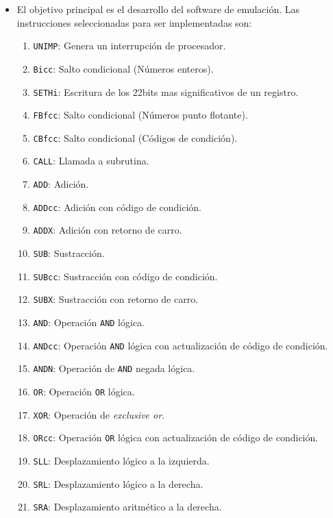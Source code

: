 \begin{itemize}
\item El objetivo principal es el desarrollo del software de emulación. Las instrucciones seleccionadas para ser implementadas son:
  \begin{enumerate}

    \item \texttt{UNIMP}: Genera un interrupción de procesador.
    \item \texttt{Bicc}: Salto condicional (Números enteros).
    \item \texttt{SETHi}: Escritura de los 22bits mas significativos de un registro.
    \item \texttt{FBfcc}: Salto condicional (Números punto flotante).
    \item \texttt{CBfcc}: Salto condicional (Códigos de condición).

    \item \texttt{CALL}: Llamada a subrutina.

    \item \texttt{ADD}: Adición.
    \item \texttt{ADDcc}: Adición con código de condición.
    \item \texttt{ADDX}: Adición con retorno de carro.

    \item \texttt{SUB}: Sustracción.
    \item \texttt{SUBcc}: Sustracción con código de condición.
    \item \texttt{SUBX}: Sustracción con retorno de carro.

    \item \texttt{AND}: Operación \texttt{AND} lógica.
    \item \texttt{ANDcc}: Operación \texttt{AND} lógica con actualización de código de condición.
    \item \texttt{ANDN}: Operación de \texttt{AND} negada lógica.

    \item \texttt{OR}: Operación \texttt{OR} lógica.
    \item \texttt{XOR}: Operación de \textit{exclusive or}.
    \item \texttt{ORcc}: Operación \texttt{OR} lógica con actualización de código de condición.

    \item \texttt{SLL}: Desplazamiento lógico a la izquierda.
    \item \texttt{SRL}: Desplazamiento lógico a la derecha.
    \item \texttt{SRA}: Desplazamiento aritmético a la derecha.


\end{enumerate}
\end{itemize}
